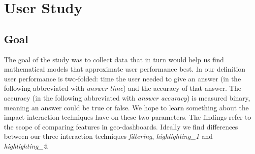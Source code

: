 \chapter{User Study}

\section{Goal}
The goal of the study was to collect data that in turn would help us find mathematical models that approximate user performance best. In our
definition user performance is two-folded: time the user needed to give an answer (in the following abbreviated with \textit{answer time}) and the
accuracy of that answer. The accuracy (in the following abbreviated with \textit{answer accuracy}) is measured binary, meaning an answer could
be true or false. We hope to learn something about the impact interaction techniques have on these two parameters. The findings refer to the scope
of comparing features in geo-dashboards. Ideally we find differences between our three interaction techniques \textit{filtering}, \textit{highlighting\_1}
and \textit{highlighting\_2}.

